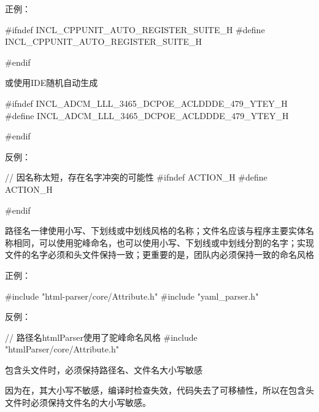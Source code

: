 \begin{content}
正例：
\begin{leftbar}
\begin{c++}
#ifndef INCL_CPPUNIT_AUTO_REGISTER_SUITE_H
#define INCL_CPPUNIT_AUTO_REGISTER_SUITE_H

#endif
\end{c++}
\end{leftbar}

或使用IDE随机自动生成

\begin{leftbar}
\begin{c++}
#ifndef INCL_ADCM_LLL_3465_DCPOE_ACLDDDE_479_YTEY_H
#define INCL_ADCM_LLL_3465_DCPOE_ACLDDDE_479_YTEY_H

#endif
\end{c++}
\end{leftbar}

反例：
\begin{leftbar}
\begin{c++}
// 因名称太短，存在名字冲突的可能性
#ifndef ACTION_H
#define ACTION_H

#endif
\end{c++}
\end{leftbar}

\begin{regulation}
路径名一律使用小写、下划线或中划线风格的名称；文件名应该与程序主要实体名称相同，可以使用驼峰命名，也可以使用小写、下划线或中划线分割的名字；实现文件的名字必须和头文件保持一致；更重要的是，团队内必须保持一致的命名风格
\end{regulation}

正例：
\begin{leftbar}
\begin{c++}
#include "html-parser/core/Attribute.h"
#include "yaml_parser.h"
\end{c++}
\end{leftbar}

反例：
\begin{leftbar}
\begin{c++}
// 路径名htmlParser使用了驼峰命名风格
#include "htmlParser/core/Attribute.h"
\end{c++}
\end{leftbar}

\begin{regulation}
包含头文件时，必须保持路径名、文件名大小写敏感
\end{regulation}

因为在，其大小写不敏感，编译时检查失效，代码失去了可移植性，所以在包含头文件时必须保持文件名的大小写敏感。


\end{content}
